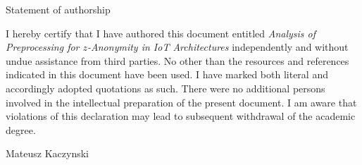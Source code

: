 \pagestyle{empty} %

\begin{center}
    \vspace*{1cm}
    {\Large Statement of authorship} 
    \vspace{1cm}
\end{center}

\noindent I hereby certify that I have authored this document entitled \textit{Analysis of Preprocessing for $z$-Anonymity in IoT Architectures} independently and without undue assistance from third parties. No other than the resources and references indicated in this document have been used. I have marked both literal and accordingly adopted quotations as such. There were no additional persons involved in the intellectual preparation of the present document. I am aware that violations of this declaration may lead to subsequent withdrawal of the academic degree.

\vspace{1cm} %

\noindent Mateusz Kaczynski